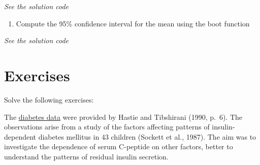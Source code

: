 \documentclass[
]{book}
\newenvironment{Shaded}{\begin{snugshade}}{\end{snugshade}}
\newcommand{\AttributeTok}[1]{\textcolor[rgb]{0.13,0.29,0.53}{#1}}
\newcommand{\CommentTok}[1]{\textcolor[rgb]{0.56,0.35,0.01}{\textit{#1}}}
\newcommand{\ControlFlowTok}[1]{\textcolor[rgb]{0.13,0.29,0.53}{\textbf{#1}}}
\newcommand{\DecValTok}[1]{\textcolor[rgb]{0.00,0.00,0.81}{#1}}
\newcommand{\FunctionTok}[1]{\textcolor[rgb]{0.13,0.29,0.53}{\textbf{#1}}}
\newcommand{\NormalTok}[1]{#1}
\newcommand{\OtherTok}[1]{\textcolor[rgb]{0.56,0.35,0.01}{#1}}
\newcommand{\SpecialCharTok}[1]{\textcolor[rgb]{0.81,0.36,0.00}{\textbf{#1}}}
\newcommand{\StringTok}[1]{\textcolor[rgb]{0.31,0.60,0.02}{#1}}
\providecommand{\tightlist}{%
  \setlength{\itemsep}{0pt}\setlength{\parskip}{0pt}}
\begin{document}
\emph{See the solution code}

\begin{Shaded}
\end{Shaded}

\begin{enumerate}
\def\labelenumi{\arabic{enumi})}
\setcounter{enumi}{1}
\tightlist
\item
  Compute the 95\% confidence interval for the mean using the boot function
\end{enumerate}

\emph{See the solution code}

\begin{Shaded}
\end{Shaded}

\section{Exercises}\label{boot.exerc}

Solve the following exercises:

The \href{https://www.dropbox.com/s/4t7nph5d97hq0qh/diabetes.csv?dl=1}{diabetes data}
were provided by Hastie and Tibshirani (1990, p.~6).
The observations arise from a study of the factors affecting patterns of
insulin-dependent diabetes mellitus in 43 children (Sockett et al., 1987).
The aim was to investigate the dependence of serum C-peptide on other factors,
better to understand the patterns of residual insulin secretion.
\end{document}
